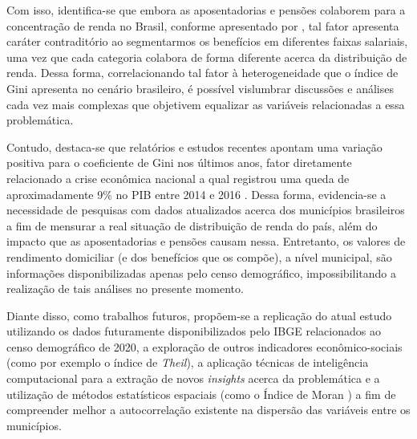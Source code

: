 Com isso, identifica-se que embora as aposentadorias e pensões colaborem para a concentração de renda no Brasil, conforme apresentado por \cite{cap04_ref7, cap04_ref8, cap04_ref9} , tal fator apresenta caráter contraditório ao segmentarmos os benefícios em diferentes faixas salariais, uma vez que cada categoria colabora de forma diferente acerca da distribuição de renda. Dessa forma, correlacionando tal fator à heterogeneidade que o índice de Gini apresenta no cenário brasileiro, é possível vislumbrar discussões e análises cada vez mais complexas que objetivem equalizar as variáveis relacionadas a essa problemática.

Contudo, destaca-se que relatórios e estudos recentes apontam uma variação positiva para o coeficiente de Gini nos últimos anos, fator diretamente relacionado a crise econômica nacional a qual registrou uma queda de aproximadamente 9\% no PIB entre 2014 e 2016 \cite{cap04_ref19}. Dessa forma, evidencia-se a necessidade de pesquisas com dados atualizados acerca dos municípios brasileiros a fim de mensurar a real situação de distribuição de renda do país, além do impacto que as aposentadorias e pensões causam nessa. Entretanto, os valores de rendimento domiciliar (e dos benefícios que os compõe), a nível municipal, são informações disponibilizadas apenas pelo censo demográfico, impossibilitando a realização de tais análises no presente momento.

Diante disso, como trabalhos futuros, propõem-se a replicação do atual estudo utilizando os dados futuramente disponibilizados pelo IBGE relacionados ao censo demográfico de 2020, a exploração de outros indicadores econômico-sociais (como por exemplo o índice de \textit{Theil}), a aplicação técnicas de inteligência computacional para a extração de novos \textit{insights} acerca da problemática e a utilização de métodos estatísticos espaciais (como o Índice de Moran \cite{cap04_ref20}) a fim de compreender melhor a autocorrelação existente na dispersão das variáveis entre os municípios.
